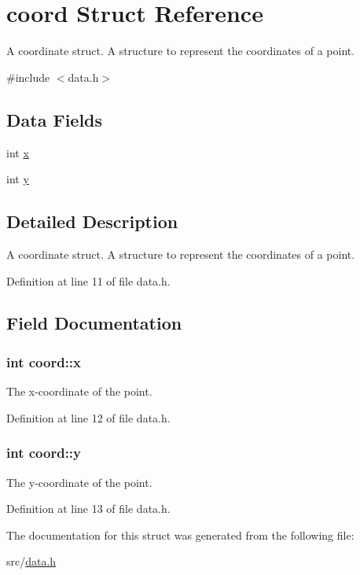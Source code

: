 \hypertarget{structcoord}{\section{coord Struct Reference}
\label{structcoord}
}


A coordinate struct. A structure to represent the coordinates of a point.  




{\ttfamily \#include $<$data.\+h$>$}

\subsection*{Data Fields}
\begin{DoxyCompactItemize}
\item 
int \hyperlink{structcoord_ac3e93ff628aa19d2888c5f6fa26f430d}{x}
\item 
int \hyperlink{structcoord_a2b099692d87f98e4844b615136ca37fb}{y}
\end{DoxyCompactItemize}


\subsection{Detailed Description}
A coordinate struct. A structure to represent the coordinates of a point. 

Definition at line 11 of file data.\+h.



\subsection{Field Documentation}
\hypertarget{structcoord_ac3e93ff628aa19d2888c5f6fa26f430d}{
\subsubsection[{x}]{\setlength{\rightskip}{0pt plus 5cm}int coord\+::x}}\label{structcoord_ac3e93ff628aa19d2888c5f6fa26f430d}
The x-\/coordinate of the point. 

Definition at line 12 of file data.\+h.

\hypertarget{structcoord_a2b099692d87f98e4844b615136ca37fb}{
\subsubsection[{y}]{\setlength{\rightskip}{0pt plus 5cm}int coord\+::y}}\label{structcoord_a2b099692d87f98e4844b615136ca37fb}
The y-\/coordinate of the point. 

Definition at line 13 of file data.\+h.



The documentation for this struct was generated from the following file\+:\begin{DoxyCompactItemize}
\item 
src/\hyperlink{data_8h}{data.\+h}\end{DoxyCompactItemize}
